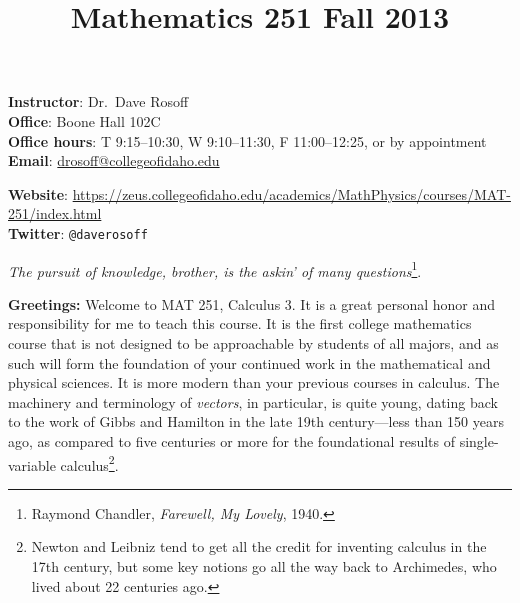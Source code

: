 \documentclass[12pt,twoside]{amsart}
\title{{\LARGE Mathematics 251 \hfill Fall 2013}}
\begin{document}
\maketitle
\thispagestyle{empty}
\vspace*{-2ex}
\begin{minipage}[t]{0.45\linewidth}
    \textbf{Instructor}: Dr.\ Dave Rosoff  \\
    \textbf{Office}: Boone Hall 102C \\
    \textbf{Office hours}: T 9:15--10:30, W 9:10--11:30, F 11:00--12:25, or by appointment \\
    \textbf{Email}: \href{mailto:drosoff@collegeofidaho.edu}{drosoff@collegeofidaho.edu} \\
\end{minipage} 
\hspace*{0.09\linewidth}
\begin{minipage}[t]{0.45\linewidth}\begin{flushright}
    \textbf{Website}: \url{https://zeus.collegeofidaho.edu/academics/MathPhysics/courses/MAT-251/index.html} \\
    \textbf{Twitter}: \verb|@daverosoff|
\end{flushright}
\end{minipage}
\vspace*{-2ex}
\begin{center}

{\large \emph{The pursuit of knowledge, brother, is the askin' of many questions}\footnote{Raymond Chandler, \emph{Farewell, My Lovely}, 1940.}}.

\end{center}

\textbf{Greetings:} Welcome to MAT 251, Calculus 3. It is a great personal honor and responsibility for me to teach this course. It is the first college mathematics course that is not designed to be approachable by students of all majors, and as such will form the foundation of your continued work in the mathematical and physical sciences. It is more modern than your previous courses in calculus. The machinery and terminology of \emph{vectors}, in particular, is quite young, dating back to the work of Gibbs and Hamilton in the late 19th century---less than 150 years ago, as compared to five centuries or more for the foundational results of single-variable calculus\footnote{Newton and Leibniz tend to get all the credit for inventing calculus in the 17th century, but some key notions go all the way back to Archimedes, who lived about 22 centuries ago.}.
\end{document}
